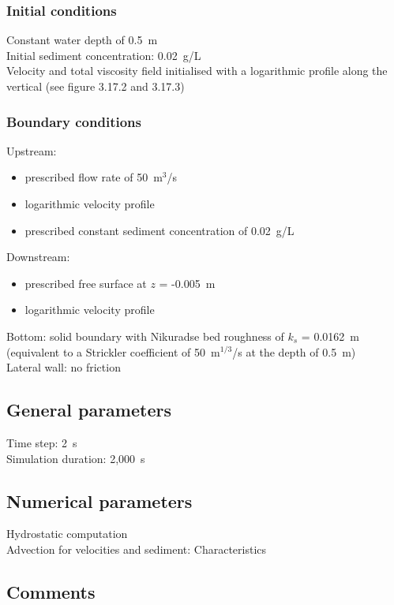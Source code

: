 \subsubsection{Initial conditions}
%
Constant water depth of 0.5~m\\
Initial sediment concentration: 0.02~g/L\\
Velocity and total viscosity field initialised with a logarithmic
profile along the vertical (see figure 3.17.2 and 3.17.3)
%
\subsubsection{Boundary conditions}
%
Upstream:
\begin{itemize}
\item prescribed flow rate of 50~m$^3$/s\\
\item logarithmic velocity profile\\
\item prescribed constant sediment concentration of 0.02~g/L
\end{itemize}
Downstream:
\begin{itemize}
\item prescribed free surface at $z$ = -0.005~m\\
\item logarithmic velocity profile
\end{itemize}
Bottom: solid boundary with Nikuradse bed roughness of $k_s$ = 0.0162~m
(equivalent to a Strickler coefficient of 50~m$^{1/3}$/s at the depth of
0.5~m)\\
Lateral wall: no friction
%
\subsection{General parameters}
%
Time step: 2~s\\
Simulation duration: 2,000~s
%
%
%
\subsection{Numerical parameters}
%
Hydrostatic computation\\
Advection for velocities and sediment: Characteristics
%
\subsection{Comments}
%
%
%
